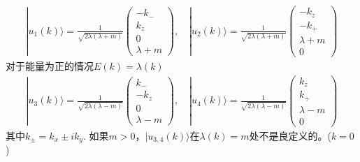 \documentclass[a4paper]{article}
\numberwithin{equation}{subsection}
\begin{document}
\begin{equation}
    \begin{split}
        |u_1(k)\rangle=\frac{1}{\sqrt{2\lambda(\lambda+m)}}\begin{pmatrix}
            -k_-\\
            k_z\\
            0\\
            \lambda+m
        \end{pmatrix},\quad |u_2(k)\rangle=\frac{1}{\sqrt{2\lambda(\lambda+m)}}\begin{pmatrix}
            -k_z\\
            -k_+\\
            \lambda+m\\
            0
        \end{pmatrix}
    \end{split}
\end{equation}
对于能量为正的情况$E(k)=\lambda(k)$
\begin{equation*}
    \begin{split}
        |u_3(k)\rangle=\frac{1}{\sqrt{2\lambda(\lambda-m)}}\begin{pmatrix}
            k_-\\
            -k_z\\
            0\\
            \lambda-m
        \end{pmatrix},\quad |u_4(k)\rangle=\frac{1}{\sqrt{2\lambda(\lambda-m)}}\begin{pmatrix}
            k_z\\
            k_+\\
            \lambda-m\\
            0
        \end{pmatrix}
    \end{split}
\end{equation*}
其中$k_\pm=k_x\pm ik_y$. 如果$m>0$，$|u_{3,4}(k)\rangle$在$\lambda(k)=m$处不是良定义的。($k=0$)
\end{document}

